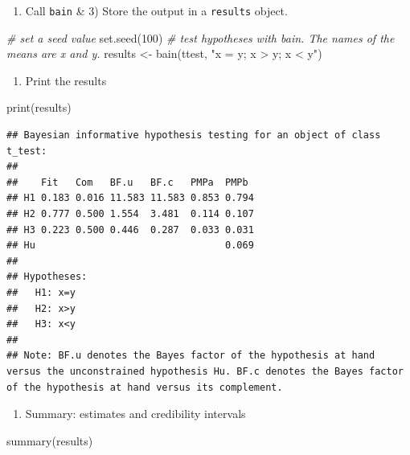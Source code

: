 \documentclass[
]{book}
\newenvironment{Shaded}{\begin{snugshade}}{\end{snugshade}}
\newcommand{\CommentTok}[1]{\textcolor[rgb]{0.56,0.35,0.01}{\textit{#1}}}
\newcommand{\DecValTok}[1]{\textcolor[rgb]{0.00,0.00,0.81}{#1}}
\newcommand{\FunctionTok}[1]{\textcolor[rgb]{0.00,0.00,0.00}{#1}}
\newcommand{\NormalTok}[1]{#1}
\newcommand{\OtherTok}[1]{\textcolor[rgb]{0.56,0.35,0.01}{#1}}
\newcommand{\StringTok}[1]{\textcolor[rgb]{0.31,0.60,0.02}{#1}}
\providecommand{\tightlist}{%
  \setlength{\itemsep}{0pt}\setlength{\parskip}{0pt}}
\begin{document}
\begin{enumerate}
\def\labelenumi{\arabic{enumi})}
\setcounter{enumi}{1}
\tightlist
\item
  Call \texttt{bain} \& 3) Store the output in a \texttt{results} object.
\end{enumerate}

\begin{Shaded}
\begin{Highlighting}[]
\CommentTok{\# set a seed value}
\FunctionTok{set.seed}\NormalTok{(}\DecValTok{100}\NormalTok{)}
\CommentTok{\# test hypotheses with bain. The names of the means are x and y.}
\NormalTok{results }\OtherTok{\textless{}{-}} \FunctionTok{bain}\NormalTok{(ttest, }\StringTok{"x = y; x \textgreater{} y; x \textless{} y"}\NormalTok{)}
\end{Highlighting}
\end{Shaded}

\begin{enumerate}
\def\labelenumi{\arabic{enumi})}
\setcounter{enumi}{2}
\tightlist
\item
  Print the results
\end{enumerate}

\begin{Shaded}
\begin{Highlighting}[]
\FunctionTok{print}\NormalTok{(results)}
\end{Highlighting}
\end{Shaded}

\begin{verbatim}
## Bayesian informative hypothesis testing for an object of class t_test:
## 
##    Fit   Com   BF.u   BF.c   PMPa  PMPb 
## H1 0.183 0.016 11.583 11.583 0.853 0.794
## H2 0.777 0.500 1.554  3.481  0.114 0.107
## H3 0.223 0.500 0.446  0.287  0.033 0.031
## Hu                                 0.069
## 
## Hypotheses:
##   H1: x=y
##   H2: x>y
##   H3: x<y
## 
## Note: BF.u denotes the Bayes factor of the hypothesis at hand versus the unconstrained hypothesis Hu. BF.c denotes the Bayes factor of the hypothesis at hand versus its complement.
\end{verbatim}

\begin{enumerate}
\def\labelenumi{\arabic{enumi})}
\setcounter{enumi}{3}
\tightlist
\item
  Summary: estimates and credibility intervals
\end{enumerate}

\begin{Shaded}
\begin{Highlighting}[]
\FunctionTok{summary}\NormalTok{(results)}
\end{Highlighting}
\end{Shaded}
\end{document}
